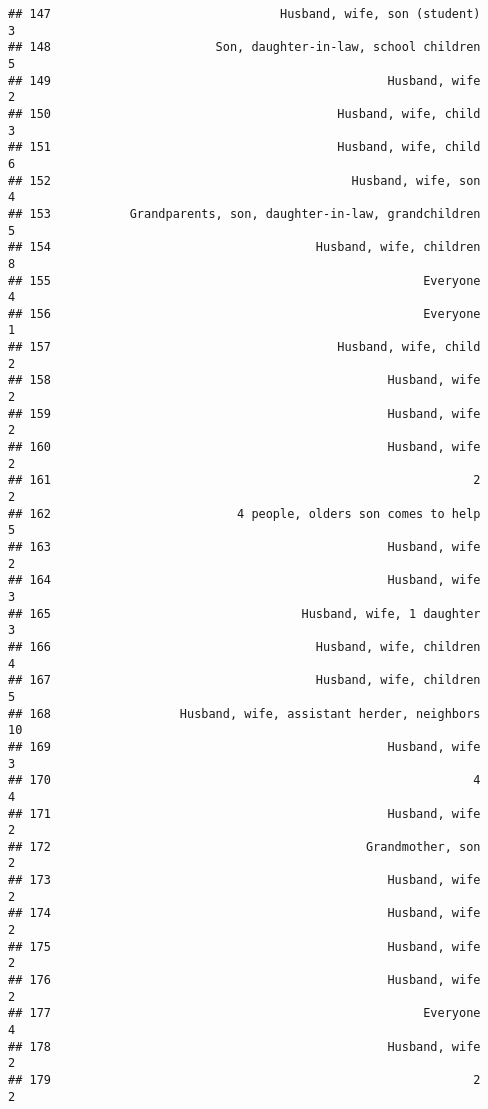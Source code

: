 \documentclass[
]{article}
\begin{document}
\begin{verbatim}
## 147                                Husband, wife, son (student)             3
## 148                       Son, daughter-in-law, school children             5
## 149                                               Husband, wife             2
## 150                                        Husband, wife, child             3
## 151                                        Husband, wife, child             6
## 152                                          Husband, wife, son             4
## 153           Grandparents, son, daughter-in-law, grandchildren             5
## 154                                     Husband, wife, children             8
## 155                                                    Everyone             4
## 156                                                    Everyone             1
## 157                                        Husband, wife, child             2
## 158                                               Husband, wife             2
## 159                                               Husband, wife             2
## 160                                               Husband, wife             2
## 161                                                           2             2
## 162                          4 people, olders son comes to help             5
## 163                                               Husband, wife             2
## 164                                               Husband, wife             3
## 165                                   Husband, wife, 1 daughter             3
## 166                                     Husband, wife, children             4
## 167                                     Husband, wife, children             5
## 168                  Husband, wife, assistant herder, neighbors            10
## 169                                               Husband, wife             3
## 170                                                           4             4
## 171                                               Husband, wife             2
## 172                                            Grandmother, son             2
## 173                                               Husband, wife             2
## 174                                               Husband, wife             2
## 175                                               Husband, wife             2
## 176                                               Husband, wife             2
## 177                                                    Everyone             4
## 178                                               Husband, wife             2
## 179                                                           2             2

\end{verbatim}
\end{document}
